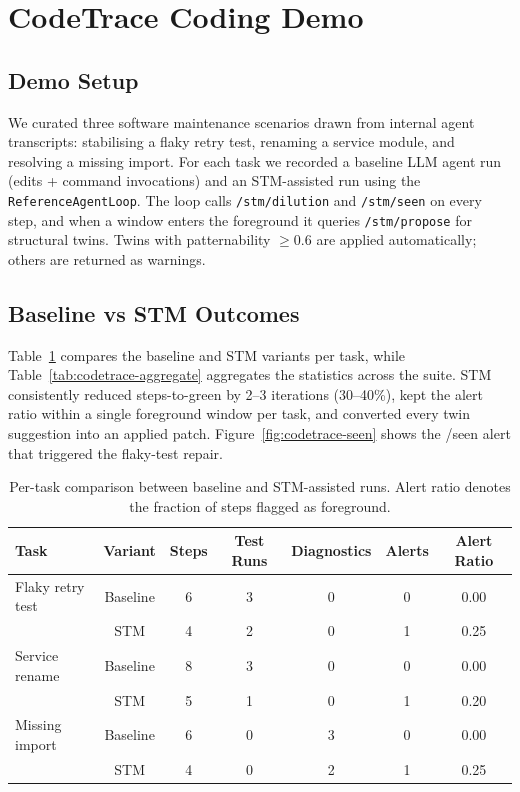 \documentclass[11pt]{article}
\begin{document}
\section{CodeTrace Coding Demo}
\subsection{Demo Setup}
We curated three software maintenance scenarios drawn from internal agent transcripts: stabilising a flaky retry test, renaming a service module, and resolving a missing import. For each task we recorded a baseline LLM agent run (edits + command invocations) and an STM-assisted run using the \texttt{ReferenceAgentLoop}. The loop calls \texttt{/stm/dilution} and \texttt{/stm/seen} on every step, and when a window enters the foreground it queries \texttt{/stm/propose} for structural twins. Twins with patternability \(\geq 0.6\) are applied automatically; others are returned as warnings.

\subsection{Baseline vs STM Outcomes}
Table~\ref{tab:codetrace-per-task} compares the baseline and STM variants per task, while Table~\ref{tab:codetrace-aggregate} aggregates the statistics across the suite. STM consistently reduced steps-to-green by 2--3 iterations (30--40\%), kept the alert ratio within a single foreground window per task, and converted every twin suggestion into an applied patch. Figure~\ref{fig:codetrace-seen} shows the {/}seen alert that triggered the flaky-test repair.

\begin{table}[h]
  \centering
  \caption{Per-task comparison between baseline and STM-assisted runs. Alert ratio denotes the fraction of steps flagged as foreground.}
  \label{tab:codetrace-per-task}
  \begin{tabular}{lcccccc}
    \toprule
    Task & Variant & Steps & Test Runs & Diagnostics & Alerts & Alert Ratio \\
    \midrule
    Flaky retry test & Baseline & 6 & 3 & 0 & 0 & 0.00 \\
                      & STM & 4 & 2 & 0 & 1 & 0.25 \\
    Service rename & Baseline & 8 & 3 & 0 & 0 & 0.00 \\
                   & STM & 5 & 1 & 0 & 1 & 0.20 \\
    Missing import & Baseline & 6 & 0 & 3 & 0 & 0.00 \\
                   & STM & 4 & 0 & 2 & 1 & 0.25 \\
    \bottomrule
  \end{tabular}
\end{table}
\end{document}

